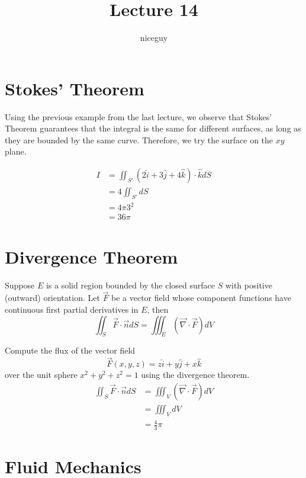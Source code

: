 \documentclass[12pt]{article}
\author{niceguy}
\title{Lecture 14}
\begin{document}
\maketitle

\section{Stokes' Theorem}

Using the previous example from the last lecture, we observe that Stokes' Theorem guarantees that the integral is the same for different surfaces, as long as they are bounded by the same curve. Therefore, we try the surface on the $xy$ plane.

\begin{align*}
	I &= \iint_{S'} (2\hat{i} + 3\hat{j} + 4\hat{k})\cdot\hat{k}dS \\
	  &= 4\iint_{S'}dS \\
	  &= 4\pi3^2 \\
	  &= 36\pi
\end{align*}

\section{Divergence Theorem}

\begin{thm}
	Suppose $E$ is a solid region bounded by the closed surface $S$ with positive (outward) orientation. Let $\vec{F}$ be a vector field whose component functions have continuous first partial derivatives in $E$, then
	$$\iint_S\vec{F}\cdot\vec{n}dS = \iiint_E\left(\vec{\nabla}\cdot\vec{F}\right)dV$$
\end{thm}

\begin{ex}
	Compute the flux of the vector field
	$$\vec{F}(x,y,z) = z\hat{i} + y\hat{j} + x\hat{k}$$
	over the unit sphere $x^2+y^2+z^2=1$ using the divergence theorem.
	\begin{align*}
		\iint_S \vec{F}\cdot\vec{n}dS &= \iiint_V\left(\vec{\nabla}\cdot\vec{F}\right)dV \\
					      &= \iiint_VdV \\
					      &= \frac{4}{3}\pi
	\end{align*}
\end{ex}

\section{Fluid Mechanics}
\end{document}

